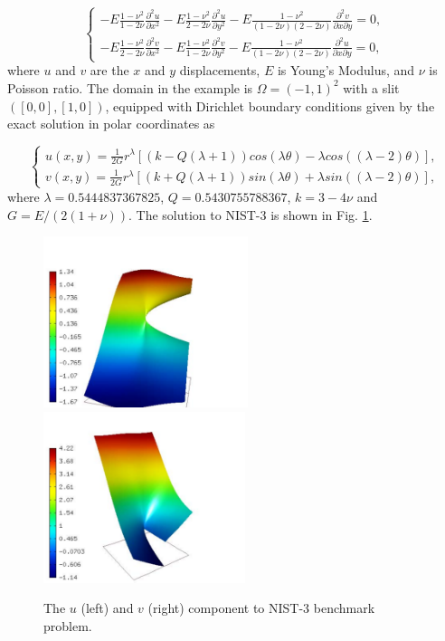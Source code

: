 \documentclass[12pt]{elsarticle}
\begin{document}
\begin{equation}\label{crack}
\left\{
\begin{array}{l}
\displaystyle
-E \frac{1-\nu^2}{1-2\nu} \frac{\partial^{2} u}{\partial x^{2}} - E\frac{1-\nu^2}{2-2 \nu} \frac{\partial^{2} u}{\partial y^{2}}
-E \frac{1-\nu^2}{(1-2\nu)(2-2\nu)} \frac{\partial^{2} v}{\partial x \partial y} = 0, \\[3mm]
\displaystyle
-E \frac{1-\nu^2}{2-2\nu} \frac{\partial^{2} v}{\partial x^{2}} - E\frac{1-\nu^2}{1-2\nu} \frac{\partial^{2} v}{\partial y^{2}}
-E \frac{1-\nu^2}{(1-2\nu)(2-2\nu)} \frac{\partial^{2} u}{\partial x \partial y} = 0,
\end{array}
\right.
\end{equation}
where $u$ and $v$ are the
$x$ and $y$ displacements, $E$ is Young's Modulus,
and $\nu$ is Poisson ratio.
The domain in the example is $\Omega = (-1, 1)^2$ with a slit $([0,0], [1,0])$,
equipped with Dirichlet boundary conditions given by the
exact solution in polar coordinates as

\[
\left\{
\begin{array}{l}
\displaystyle
u(x, y) = \frac{1}{2G} r^{\lambda}[(k - Q(\lambda + 1))cos(\lambda \theta) - \lambda cos((\lambda - 2) \theta)],  \\[3mm]
\displaystyle
v(x, y) = \frac{1}{2G} r^{\lambda}[(k + Q(\lambda + 1))sin(\lambda \theta) + \lambda sin((\lambda - 2) \theta)],
\end{array}
\right.
\]
where $\lambda = 0.5444837367825$, $Q = 0.5430755788367$,
$k = 3 - 4 \nu$ and $G = E / (2(1 + \nu))$.
The solution to NIST-3 is shown in Fig. \ref{fig:sln-nist03}.

\begin{figure}[H]
\centering
\includegraphics[height=5cm]{mafig13.pdf}\ \
\includegraphics[height=5cm]{mafig14.pdf}
\caption{The $u$ (left) and $v$ (right) component to NIST-3 benchmark problem.}
\label{fig:sln-nist03}
\end{figure}
\end{document}
